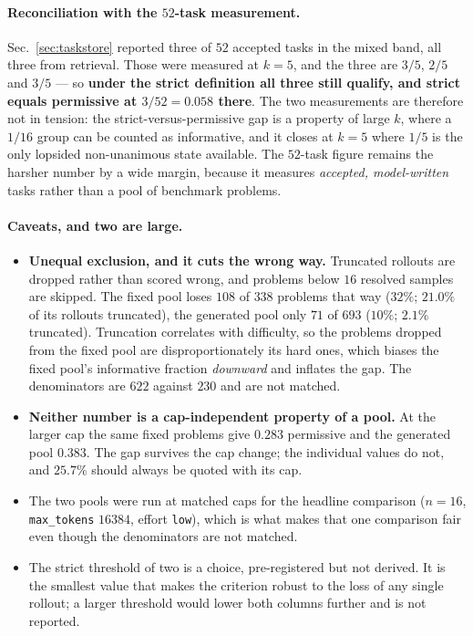 \paragraph{Reconciliation with the $52$-task measurement.} Sec.~\ref{sec:taskstore} reported
three of $52$ accepted tasks in the mixed band, all three from retrieval. Those were measured
at $k=5$, and the three are $3/5$, $2/5$ and $3/5$ --- so \textbf{under the strict definition
all three still qualify, and strict equals permissive at $3/52 = 0.058$ there}. The two
measurements are therefore not in tension: the strict-versus-permissive gap is a property of
large $k$, where a $1/16$ group can be counted as informative, and it closes at $k=5$ where
$1/5$ is the only lopsided non-unanimous state available. The $52$-task figure remains the
harsher number by a wide margin, because it measures \emph{accepted, model-written} tasks
rather than a pool of benchmark problems.

\paragraph{Caveats, and two are large.}
\begin{itemize}
\item \textbf{Unequal exclusion, and it cuts the wrong way.} Truncated rollouts are dropped
rather than scored wrong, and problems below $16$ resolved samples are skipped. The fixed pool
loses $108$ of $338$ problems that way ($32\%$; $21.0\%$ of its rollouts truncated), the
generated pool only $71$ of $693$ ($10\%$; $2.1\%$ truncated). Truncation correlates with
difficulty, so the problems dropped from the fixed pool are disproportionately its hard ones,
which biases the fixed pool's informative fraction \emph{downward} and inflates the gap. The
denominators are $622$ against $230$ and are not matched.
\item \textbf{Neither number is a cap-independent property of a pool.} At the larger cap the
same fixed problems give $0.283$ permissive and the generated pool $0.383$. The gap survives
the cap change; the individual values do not, and $25.7\%$ should always be quoted with its
cap.
\item The two pools were run at matched caps for the headline comparison ($n{=}16$,
\texttt{max\_tokens} $16384$, effort \texttt{low}), which is what makes that one comparison
fair even though the denominators are not matched.
\item The strict threshold of two is a choice, pre-registered but not derived. It is the
smallest value that makes the criterion robust to the loss of any single rollout; a larger
threshold would lower both columns further and is not reported.
\end{itemize}

